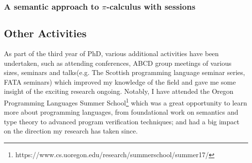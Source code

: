 \subsubsection{A semantic approach to $\pi$-calculus with sessions}





\subsection{Other Activities}
\label{sec:Activities}

As part of the third year of PhD, various additional activities have been undertaken, such as attending conferences, ABCD group meetings of various sizes, seminars and talks(e.g. The Scottish programming language seminar series, FATA seminars) which improved my knowledge of the field and gave me some insight of the exciting research ongoing. Notably, I have attended the Oregon Programming Languages Summer School\footnote{https://www.cs.uoregon.edu/research/summerschool/summer17/}
which was a great opportunity to learn more about programming languages, from  foundational work on semantics and type theory to advanced program verification techniques; and had a big impact on the direction my research has taken since.

